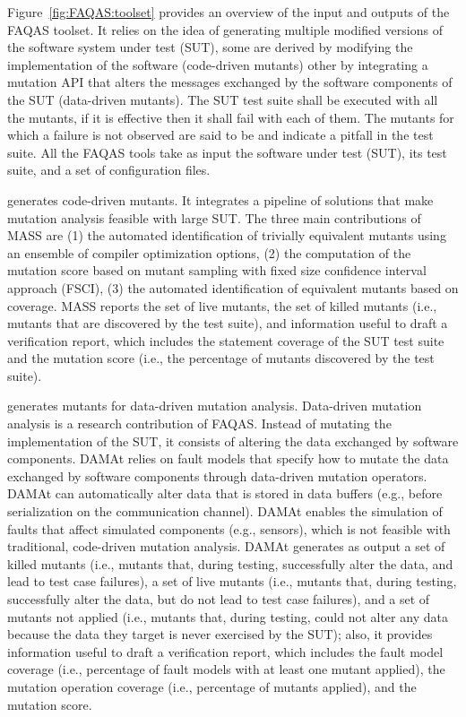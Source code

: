 Figure~\ref{fig:FAQAS:toolset} provides an overview of the input and outputs of the FAQAS toolset. It relies on the idea of generating multiple modified versions of the software system under test (SUT), some are derived by modifying the implementation of the software (code-driven mutants) other by integrating a mutation API that alters the messages exchanged by the software components of the SUT (data-driven mutants).
The SUT test suite shall be executed with all the mutants, if it is effective then it shall fail with each of them. The mutants for which a failure is not observed are said to be  and indicate a pitfall in the test suite.
All the FAQAS tools take as input the software under test (SUT), its test suite, and a set of configuration files.

 generates code-driven mutants. It integrates a pipeline of solutions that make mutation analysis feasible with large SUT. The three main contributions of MASS are (1) the automated identification of trivially equivalent mutants using an ensemble of compiler optimization options, (2) the computation of the mutation score based on mutant sampling with fixed size confidence interval approach (FSCI), (3) the automated identification of equivalent mutants based on coverage.
MASS reports the set of live mutants, the set of killed mutants (i.e., mutants that are discovered by the test suite), and information useful to draft a verification report, which includes the statement coverage of the SUT test suite and the mutation score (i.e., the percentage of mutants discovered by the test suite).

 generates mutants for data-driven mutation analysis. Data-driven mutation analysis is a research contribution of FAQAS. Instead of mutating the implementation of the SUT, it consists of altering the data exchanged by software components.
DAMAt relies on fault models that specify how to mutate the data exchanged by software components through data-driven mutation operators. DAMAt can automatically alter data that is stored in data buffers (e.g., before serialization on the communication channel).
DAMAt enables the simulation of faults that affect simulated components (e.g., sensors), which is not feasible with traditional, code-driven mutation analysis.
DAMAt generates as output a set of killed mutants (i.e., mutants that, during testing, successfully alter the data, and lead to test case failures), a set of live mutants (i.e., mutants that, during testing, successfully alter the data, but do not lead to test case failures), and a set of mutants not applied (i.e., mutants that, during testing, could not alter any data because the data they target is never exercised by the SUT); also, it provides information useful to draft a verification report, which includes the fault model coverage (i.e., percentage of fault models with at least one mutant applied), the mutation operation coverage (i.e., percentage of mutants applied), and the mutation score.

